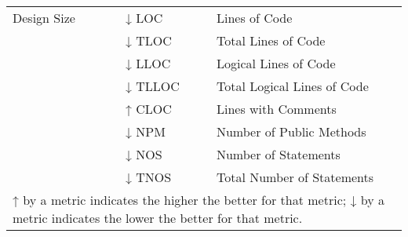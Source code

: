 \begin{table}
\begin{threeparttable}
\begin{adjustbox}{width=1.0\textwidth,center}
\begin{tabular}{llll}
Design Size & \cite{chavez2017does} & ↓ LOC & Lines of Code \\
& \cellcolor{gray!30}\cite{islam2018characteristics} &\cellcolor{gray!30}↓ TLOC &\cellcolor{gray!30}Total Lines of Code   \\
& \cite{chavez2017does} & ↓ LLOC &Logical Lines of Code   \\
& \cellcolor{gray!30}\cite{islam2018characteristics} & \cellcolor{gray!30}↓ TLLOC&\cellcolor{gray!30}Total Logical Lines of Code  \\
            & \cite{chavez2017does} & ↑  CLOC&Lines with Comments  \\
            & \cellcolor{gray!30}\cite{stroggylos2007refactoring} & \cellcolor{gray!30}↓ NPM &\cellcolor{gray!30}Number of Public Methods  \\
            &\cite{islam2018characteristics} &↓ NOS& Number of Statements  \\
            &\cellcolor{gray!30}\cite{islam2018characteristics} & \cellcolor{gray!30}↓ TNOS&\cellcolor{gray!30}Total Number of Statements  \\
\bottomrule
\multicolumn{4}{l}{\tiny 
↑ by a metric indicates the higher the better for that metric; 
↓ by a metric indicates the lower the better for that metric.}
\end{tabular}
\end{adjustbox}
\end{threeparttable}
\end{table}
